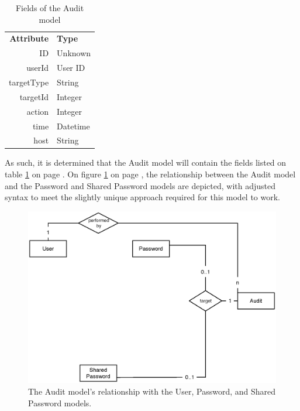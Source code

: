 			\begin{table}[p]
				\centering
				\begin{tabular}{r|l}
					\textbf{Attribute} 		& \textbf{Type} 		\\
					ID 						& Unknown 	\\
					userId 					& User ID 	\\
					targetType 				& String 	\\
					targetId				& Integer 	\\
					action					& Integer 	\\
					time  					& Datetime 	\\
					host  					& String 	\\
				\end{tabular}
				\caption{Fields of the Audit model}
				\label{fig:model:audit}
			\end{table}

			As such, it is determined that the Audit model will contain the fields listed on table \ref{fig:model:audit} on page \pageref{fig:model:audit}. On figure \ref{fig:relationship:audit-user} on page \pageref{fig:relationship:audit-user}, the relationship between the Audit model and the Password and Shared Password models are depicted, with adjusted syntax to meet the slightly unique approach required for this model to work.
			
			\begin{figure}[p]
				\centering
				\includegraphics[width=\textwidth]{figures/design/uml/erd/audit-user-password-sharedpassword.eps}
				\caption{The Audit model's relationship with the User, Password, and Shared Password models.}
				\label{fig:relationship:audit-user}
			\end{figure}

